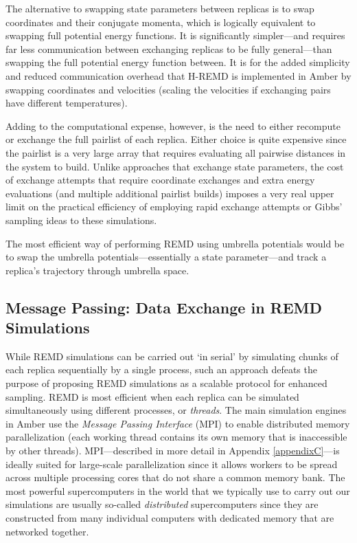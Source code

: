 The alternative to swapping state parameters between replicas is to swap
coordinates and their conjugate momenta, which is logically equivalent to
swapping full potential energy functions. It is significantly simpler---and
requires far less communication between exchanging replicas to be fully
general---than swapping the full potential energy function between. It is for
the added simplicity and reduced communication overhead that H-REMD is
implemented in Amber by swapping coordinates and velocities (scaling the
velocities if exchanging pairs have different temperatures).
\cite{Meng_JChemTheoryComput_2011_v7_p2721}

Adding to the computational expense, however, is the need to either recompute or
exchange the full pairlist of each replica. Either choice is quite expensive
since the pairlist is a very large array that requires evaluating all pairwise
distances in the system to build. Unlike approaches that exchange state
parameters, the cost of exchange attempts that require coordinate exchanges and
extra energy evaluations (and multiple additional pairlist builds) imposes a
very real upper limit on the practical efficiency of employing rapid exchange
attempts or Gibbs' sampling ideas to these simulations.

The most efficient way of performing REMD using umbrella potentials would be to
swap the umbrella potentials---essentially a state parameter---and track a
replica's trajectory through umbrella space.

\subsection{Message Passing: Data Exchange in REMD Simulations}

While REMD simulations can be carried out `in serial' by simulating chunks of
each replica sequentially by a single process, such an approach defeats the
purpose of proposing REMD simulations as a scalable protocol for enhanced
sampling. REMD is most efficient when each replica can be simulated
simultaneously using different processes, or \emph{threads}. The main simulation
engines in Amber use the \emph{Message Passing Interface} (MPI) to enable
distributed memory parallelization (\ie each working thread contains its own
memory that is inaccessible by other threads). MPI---described in more detail in
Appendix \ref{appendixC}---is ideally suited for large-scale parallelization
since it allows workers to be spread across multiple processing cores that do
not share a common memory bank. The most powerful supercomputers in the world
that we typically use to carry out our simulations are usually so-called
\emph{distributed} supercomputers since they are constructed from many
individual computers with dedicated memory that are networked together.

